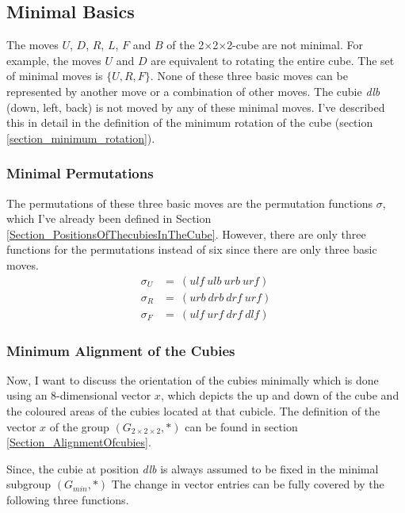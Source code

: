 \documentclass[12pt,a4paper]{article}
\theoremstyle{custom}
\newcommand{\Gtwo}{\ensuremath{G_{2\times 2\times 2}}}
\newcommand{\Ttwo}{2$\times$2$\times$2-}
\begin{document}
\subsection{Minimal Basics}
\label{Section_MinimalPermutations}
\label{Section_MinimalBasics}

The moves $U$, $D$, $R$, $L$, $F$ and $B$ of the \Ttwo cube are not minimal. For example, the moves $U$ and $D$ are equivalent to rotating the entire cube.
The set of minimal moves is $\{U, R, F\}$. None of these three basic moves can be represented by another move or a combination of other moves. The cubie \textit{dlb} (down, left, back) is not moved by any of these minimal moves. I've described this in detail in the definition of the minimum rotation of the cube (section \ref{section_minimum_rotation}).

\subsubsection{Minimal Permutations}

The permutations of these three basic moves are the permutation functions $\sigma$, which I've already been defined in Section \ref{Section_PositionsOfThecubiesInTheCube}. However, there are only three functions for the permutations instead of six since there are only three basic moves.
\begin{align*}
\sigma_U & =\ ( \textit{ulf} \ \textit{ulb} \ \textit{urb} \ \textit{urf} ) \\
\sigma_R & =\ ( \textit{urb} \ \textit{drb} \ \textit{drf} \ \textit{urf} ) \\
\sigma_F & =\ ( \textit{ulf} \ \textit{urf} \ \textit{drf} \ \textit{dlf} )
\end{align*}

\subsubsection{Minimum Alignment of the Cubies}
Now, I want to discuss the orientation of the cubies minimally which is done using an 8-dimensional vector $x$, which depicts the up and down of the cube and the coloured areas of the cubies located at that cubicle. The definition of the vector $x$ of the group $\left(\Gtwo, \scriptstyle* \right)$ can be found in section \ref{Section_AlignmentOfcubies}.

Since, the cubie at position \textit{dlb} is always assumed to be fixed in the minimal subgroup $(G_{min}, \scriptstyle*)$
\newpage
The change in vector entries can be fully covered by the following three functions.
\end{document}
